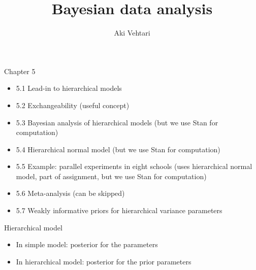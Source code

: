 \documentclass[finnish,english,t]{beamer}
\title[]{Bayesian data analysis}
\subtitle{}
\author{Aki Vehtari}
\institute[Aalto]{}
\begin{document}
\begin{frame}{Chapter 5}

  \begin{itemize}
\item 5.1 Lead-in to hierarchical models
\item 5.2 Exchangeability (useful concept)
\item 5.3 Bayesian analysis of hierarchical models (but we use Stan for computation)
\item 5.4 Hierarchical normal model (but we use Stan for computation)
\item 5.5 Example: parallel experiments in eight schools (uses hierarchical normal model, part of assignment, but we use Stan for computation)
\item {\color{gray}5.6 Meta-analysis (can be skipped)}
\item 5.7 Weakly informative priors for hierarchical variance parameters
\end{itemize}
\end{frame}

\begin{frame}{Hierarchical model}

  \begin{itemize}
  \item In simple model: posterior for the parameters
  \item In hierarchical model: posterior for the prior parameters
  \end{itemize}

\end{frame}
\end{document}
